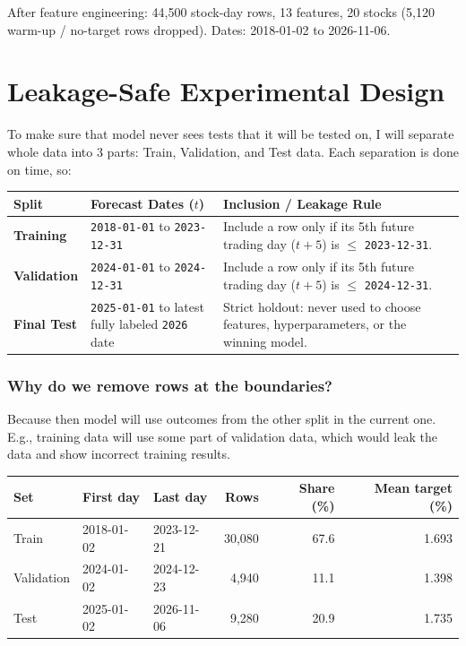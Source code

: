 \documentclass[11pt]{article}
\newcommand{\code}[1]{\texttt{#1}}
\begin{document}
After feature engineering: 44,500 stock-day rows, 13 features, 20 stocks (5,120 warm-up / no-target rows dropped). Dates: 2018-01-02 to 2026-11-06.

\section{Leakage-Safe Experimental Design}

To make sure that model never sees tests that it will be tested on, I will separate whole data into 3 parts: Train, Validation, and Test data. Each separation is done on time, so:

\begin{center}
{\small
\begin{tabular}{l>{\raggedright}p{4.2cm}>{\raggedright\arraybackslash}p{7.3cm}}
\hline
\textbf{Split} & \textbf{Forecast Dates ($t$)} & \textbf{Inclusion / Leakage Rule} \\
\hline
\textbf{Training} & \code{2018-01-01} to \code{2023-12-31} & Include a row only if its 5th future trading day ($t+5$) is $\le$ \code{2023-12-31}. \\
\textbf{Validation} & \code{2024-01-01} to \code{2024-12-31} & Include a row only if its 5th future trading day ($t+5$) is $\le$ \code{2024-12-31}. \\
\textbf{Final Test} & \code{2025-01-01} to latest fully labeled \code{2026} date & Strict holdout: never used to choose features, hyperparameters, or the winning model. \\
\hline
\end{tabular}
}
\end{center}

\subsubsection*{Why do we remove rows at the boundaries?}

Because then model will use outcomes from the other split in the current one. E.g., training data will use some part of validation data, which would leak the data and show incorrect training results.

\begin{center}
{\small
\begin{tabular}{lllrrr}
\hline
\textbf{Set} & \textbf{First day} & \textbf{Last day} & \textbf{Rows} & \textbf{Share (\%)} & \textbf{Mean target (\%)} \\
\hline
Train & 2018-01-02 & 2023-12-21 & 30,080 & 67.6 & 1.693 \\
Validation & 2024-01-02 & 2024-12-23 & 4,940 & 11.1 & 1.398 \\
Test & 2025-01-02 & 2026-11-06 & 9,280 & 20.9 & 1.735 \\
\hline
\end{tabular}
}
\end{center}
\end{document}
